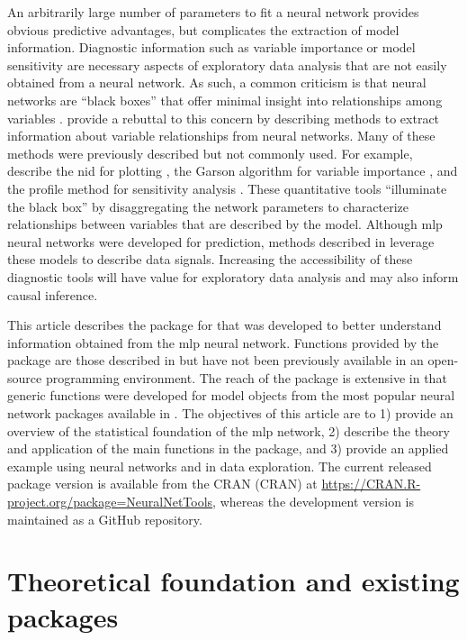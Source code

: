 \documentclass[article]{jss}
\begin{document}
An arbitrarily large number of parameters to fit a neural network
provides obvious predictive advantages, but complicates the extraction
of model information.  Diagnostic information such as variable
importance or model sensitivity are necessary aspects of exploratory
data analysis that are not easily obtained from a neural network. As
such, a common criticism is that neural networks are ``black boxes''
that offer minimal insight into relationships among variables
\citep[e.g.,][]{Paruelo97}.  \citet{Olden02} provide a rebuttal to
this concern by describing methods to extract information about
variable relationships from neural networks.  Many of these methods
were previously described but not commonly used.  For example,
\citet{Olden02} describe the \ac{nid} for plotting \citep{Ozesmi99},
the Garson algorithm for variable importance \citep{Garson91}, and the
profile method for sensitivity analysis \citep{Lek96}.  These
quantitative tools ``illuminate the black box'' by disaggregating the
network parameters to characterize relationships between variables
that are described by the model.  Although \ac{mlp} neural networks
were developed for prediction, methods described in \citet{Olden02}
leverage these models to describe data signals.  Increasing the
accessibility of these diagnostic tools will have value for exploratory
data analysis and may also inform causal inference.

This article describes the  package
\citep{NeuralNetTools} for  \citep{R} that was developed
to better understand information obtained from the \ac{mlp} neural
network.  Functions provided by the package are those described in
\citet{Olden02} but have not been previously available in an
open-source programming environment.  The reach of the package is
extensive in that generic functions were developed for model objects
from the most popular neural network packages available in
.  The objectives of this article are to 1) provide an
overview of the statistical foundation of the \ac{mlp} network, 2)
describe the theory and application of the main functions in the
 package, and 3) provide an applied example using
neural networks and  in data exploration.  The
current released package version is available from the \ac{CRAN}
(CRAN) at \url{https://CRAN.R-project.org/package=NeuralNetTools},
whereas the development version is maintained as a GitHub repository.

\section[Theoretical foundation and existing R packages]{Theoretical foundation and existing  packages}
\end{document}

